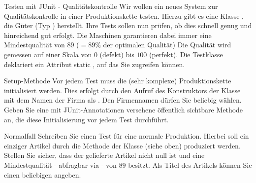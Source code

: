 \documentclass{../preamble}
\begin{document}
\clearpage

\begin{task}[credit = \stars{2}{3}]{Testen mit JUnit - Qualitätskontrolle}
    Wir wollen ein neues System zur Qualitätskontrolle in einer Produktionskette testen. Hierzu gibt es eine Klasse , die Güter (Typ ) herstellt. Ihre Tests sollen nun prüfen, ob dies schnell genug und hinreichend gut erfolgt. Die Maschinen garantieren dabei immer eine Mindestqualität von \(89\) (\(= 89\%\) der optimalen Qualität)
    \br
    Die Qualität wird gemessen auf einer Skala von \(0\) (defekt) bis \(100\) (perfekt).
    \br
    Die Testklasse deklariert ein Attribut \textcolor{keywordcolor}{static} , auf das Sie zugreifen können.

    \begin{subtask*}{Setup-Methode}
        Vor jedem Test muss die (sehr komplexe) Produktionskette initialisiert werden. Dies erfolgt durch den Aufruf des Konstruktors der Klasse  mit dem Namen der Firma als . Den Firmennamen dürfen Sie beliebig wählen. Geben Sie eine mit JUnit-Annotationen versehene öffentlich sichtbare Methode an, die diese Initialisierung vor jedem Test durchführt.

        \begin{solution}
            
        \end{solution}
    \end{subtask*}

    \begin{subtask*}{Normalfall}
        Schreiben Sie einen Test für eine normale Produktion. Hierbei soll ein einziger  Artikel  durch die Methode   der Klasse  (siehe oben) produziert werden. Stellen Sie sicher, dass  der gelieferte Artikel nicht \textcolor{keywordcolor}{null} ist und eine Mindestqualität - abfragbar via  - von \(89\) besitzt. Als Titel des Artikels können Sie einen beliebigen  angeben.

        \begin{solution}
            
        \end{solution}
    \end{subtask*}

    \clearpage


\end{task}
\end{document}
